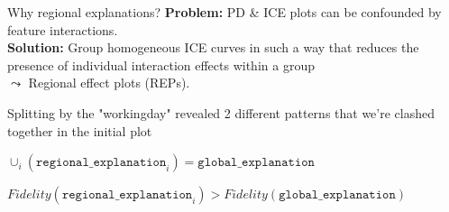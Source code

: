 \documentclass[10pt,compress,t,notes=noshow,xcolor=table]{beamer}
\begin{document}
\begin{framev}[align=top]{Why regional explanations?}
\textbf{Problem:} PD \& ICE plots can be confounded by feature interactions.\\
\textbf{Solution:} Group homogeneous ICE curves in such a way that reduces the presence of individual interaction effects within a group \\$\leadsto$ Regional effect plots (REPs).
\noindent\makebox[\linewidth]{\rule{\textwidth}{0.4pt}}
\spacer[0]
\begin{itemizeM}
\item Splitting by the "workingday" revealed 2 different patterns that we're clashed together in the initial plot
\item $\cup_i (\texttt{regional\_explanation}_i) = \texttt{global\_explanation} $
\item $Fidelity (\texttt{regional\_explanation}_i ) > Fidelity(\texttt{global\_explanation} ) $
\end{itemizeM}
\end{framev}
\end{document}
